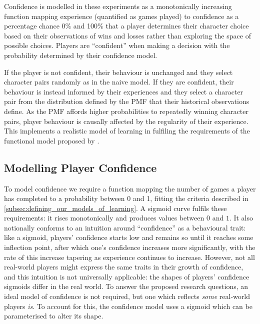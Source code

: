 Confidence is modelled in these experiments as a monotonically increasing
function mapping experience (quantified as games played) to confidence as
a percentage chance 0\% and 100\% that a player determines their
character choice based on their observations of wins and losses rather than
exploring the space of possible choices. Players are ``confident'' when making a
decision with the probability determined by their confidence model.

If the player is not confident, their behaviour is unchanged and they select
character pairs randomly as in the naive model. If they are confident, their
behaviour is instead informed by their experiences and they select a character
pair from the distribution defined by the PMF that their historical observations
define. As the PMF affords higher probabilities to repeatedly winning character
pairs, player behaviour is causally affected by the regularity of their
experience. This implements a realistic model of learning in fulfiling the
requirements of the functional model proposed by \citet{lachman1997learning}.

\subsection{Modelling Player Confidence}\label{subsec:confidence_model}

To model confidence we require a function mapping the number of games a player
has completed to a probability between 0 and 1, fitting the criteria described
in \cref{subsec:defining_our_models_of_learning}. A sigmoid curve fulfils these
requirements: it rises monotonically and produces values between $0$ and $1$. It
also notionally conforms to an intuition around ``confidence'' as a behavioural
trait: like a sigmoid, players' confidence starts low and remains so until it
reaches some inflection point, after which one's confidence increases more
significantly, with the rate of this increase tapering as experience continues to
increase. However, not all real-world players might express the same traits in
their growth of confidence, and this intuition is not universally applicable:
the shapes of players' confidence sigmoids differ in the real world. To answer
the proposed research questions, an ideal model of confidence is not required,
but one which reflects \emph{some} real-world players \emph{is}. To account
for this, the confidence model uses a sigmoid which can be parameterised to
alter its shape.

